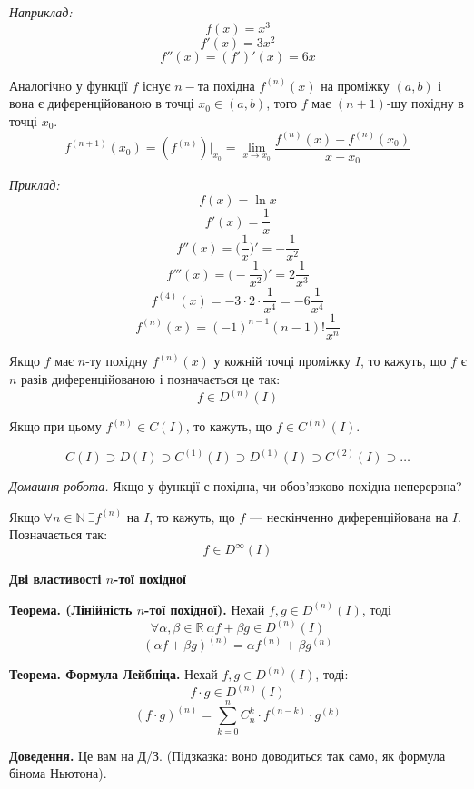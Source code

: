 \documentclass[12pt]{report}
\begin{document}
\textit{Наприклад:}
$$f(x) = x^3$$
$$f'(x) = 3 x^2$$
$$f''(x) = (f')'(x) = 6x$$

Аналогічно у функції $f$ існує $n-$та  похідна $f^{(n)}(x)$ на проміжку $(a,b)$ і вона є диференційованою в точці $x_0 \in (a,b)$, того
$f$ має $(n+1)$-шу похідну в точці $x_0$.
$$f^{(n+1)}(x_0) = (f^{(n)})|_{x_0} = \lim_{x\to x_0}\frac{f^{(n)}(x) - f^{(n)}(x_0)}{x - x_0}$$

\textit{Приклад:}
$$f(x) = \ln x$$
$$f'(x) = \frac{1}{x}$$
$$f''(x) = \Big( \frac{1}{x} \Big)' = -\frac{1}{x^2}$$
$$f'''(x) = \Big( -\frac{1}{x^2} \Big)' = 2\frac{1}{x^3}$$
$$f^{(4)}(x) = -3 \cdot 2 \cdot \frac{1}{x^4} = -6 \frac{1}{x^4}$$
$$f^{(n)}(x) = (-1)^{n-1}(n-1)!\frac{1}{x^n}$$

Якщо $f$ має $n$-ту похідну $f^{(n)}(x)$ у кожній точці проміжку $I$, то кажуть, що $f$ є $n$ разів диференційованою і позначається це так:
$$f \in D^{(n)}(I)$$

Якщо при цьому $f^{(n)} \in C(I)$, то кажуть, що $f \in C^{(n)}(I)$.

$$C(I) \supset D(I) \supset C^{(1)}(I) \supset D^{(1)}(I) \supset C^{(2)}(I) \supset \ldots$$

\textit{Домашня робота.} Якщо у функції є похідна, чи обов'язково похідна неперервна?

\vspace{3mm}

Якщо $\forall n \in \mathbb{N}\ \exists f^{(n)}$ на $I$, то кажуть, що $f$ --- нескінченно диференційована на $I$. Позначається так:
$$f \in D^{\infty}(I)$$

\begin{center}

\textbf{\large{Дві властивості $n$-тої похідної}}

\end{center}

\textbf{Теорема. (Лінійність $n$-тої похідної).} Нехай $f,g \in D^{(n)}(I)$, тоді 
$$\forall \alpha, \beta \in \mathbb{R}\ \alpha f  +\beta g \in D^{(n)}(I)$$
$$(\alpha f + \beta g)^{(n)} = \alpha f^{(n)} + \beta g^{(n)}$$

\textbf{Теорема. Формула Лейбніца.} Нехай $f,g \in D^{(n)}(I)$, тоді: 
$$f \cdot g \in D^{(n)}(I)$$
$$(f \cdot g)^{(n)} = \sum_{k = 0}^{n} C_n^k \cdot f^{(n-k)} \cdot g^{(k)}$$

\textbf{Доведення.} Це вам на Д/З. (Підзказка: воно доводиться так само, як формула бінома Ньютона).

\vspace{3mm}
\end{document}
